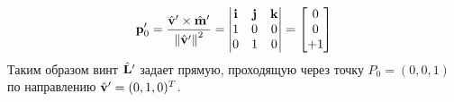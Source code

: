 \begin{frame}
\begin{columns}
\begin{column}{0.6\textwidth}
\begin{equation*}
        \vb{p}^{\prime}_{0} = 
        \dfrac{\hat{\vb{v}}^{\prime} \times \hat{\vb{m}}^{\prime}}{\norm{\hat{\vb{v}}^{\prime}}^2} = 
        \begin{vmatrix}
          \vb{i} & \vb{j} & \vb{k}\\
          1 & 0 & 0\\
          0 & 1 & 0
        \end{vmatrix}
        =
        \begin{bmatrix}
          0\\0\\+1
        \end{bmatrix}
      \end{equation*}
      Таким образом винт $\hat{\vb{L}}^{\prime}$ задает прямую, проходящую через точку $P_0 = (0, 0, 1)$ по направлению $\hat{\vb{v}}^{\prime} = (0, 1, 0)^T$. 
    \end{column}
  \end{columns}
\end{frame}

